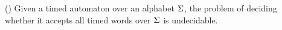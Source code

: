 



\begin{lemma}{(\cite{DBLP:conf/tapsoft/Vaandrager97})}
Given a timed automaton over an alphabet $\Sigma$, the problem of deciding whether it accepts all timed words over $\Sigma$ is undecidable.
\end{lemma}

